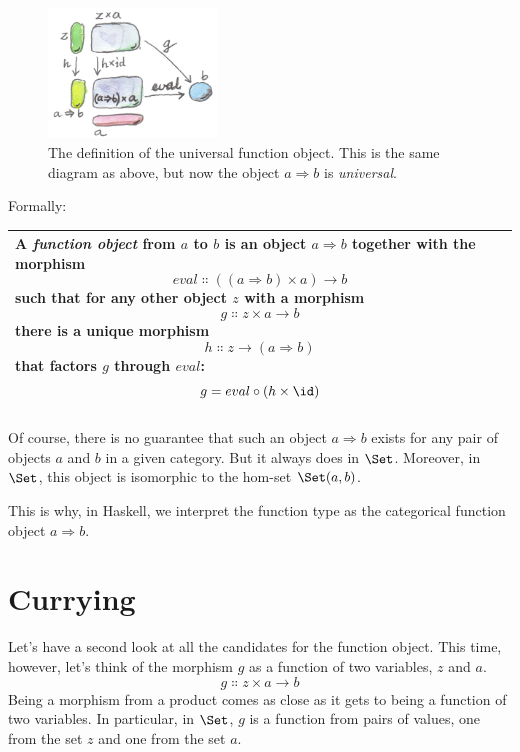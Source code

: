 \begin{figure}[H]
\centering
\includegraphics[width=0.4\textwidth]{images/universalfunctionobject.jpg}
\caption{The definition of the universal function object. This is the same
diagram as above, but now the object $a \Rightarrow b$ is \emph{universal}.}
\end{figure}

\noindent
Formally:

\begin{longtable}[]{@{}l@{}}
\toprule
\begin{minipage}[t]{0.97\columnwidth}\raggedright\strut
A \emph{function object} from $a$ to $b$ is an object
$a \Rightarrow b$ together with the morphism
\[eval \Colon ((a \Rightarrow b) \times a) \to b\]
such that for any other object $z$ with a morphism
\[g \Colon z \times a \to b\]
there is a unique morphism
\[h \Colon z \to (a \Rightarrow b)\]
that factors $g$ through $eval$:
\[g = eval \circ (h \times \id)\]
\end{minipage}\tabularnewline
\bottomrule
\end{longtable}

\noindent
Of course, there is no guarantee that such an object $a \Rightarrow b$ exists
for any pair of objects $a$ and $b$ in a given category.
But it always does in $\Set$. Moreover, in $\Set$, this
object is isomorphic to the hom-set $\Set(a, b)$.

This is why, in Haskell, we interpret the function type
 as the categorical function object $a \Rightarrow b$.

\section{Currying}

Let's have a second look at all the candidates for the function object.
This time, however, let's think of the morphism $g$ as a function
of two variables, $z$ and $a$.
\[g \Colon z \times a \to b\]
Being a morphism from a product comes as close as it gets to being a
function of two variables. In particular, in $\Set$, $g$ is
a function from pairs of values, one from the set $z$ and one
from the set $a$.

